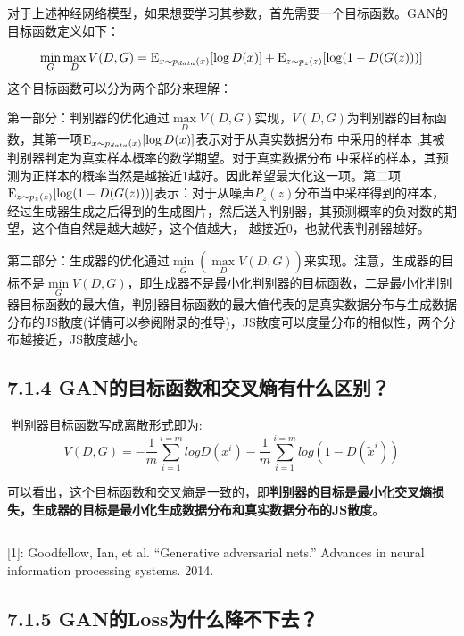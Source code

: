 ​
对于上述神经网络模型，如果想要学习其参数，首先需要一个目标函数。GAN的目标函数定义如下：

\[
\mathop {\min }\limits_G \mathop {\max }\limits_D V(D,G) = {\rm E}_{x\sim{p_{data}(x)}}[\log D(x)] + {\rm E}_{z\sim{p_z}(z)}[\log (1 - D(G(z)))]
\] ​ 这个目标函数可以分为两个部分来理解：

​
第一部分：判别器的优化通过\(\mathop {\max}\limits_D V(D,G)\)实现，\(V(D,G)\)为判别器的目标函数，其第一项\({\rm E}_{x\sim{p_{data}(x)}}[\log D(x)]\)表示对于从真实数据分布
中采用的样本 ,其被判别器判定为真实样本概率的数学期望。对于真实数据分布
中采样的样本，其预测为正样本的概率当然是越接近1越好。因此希望最大化这一项。第二项\({\rm E}_{z\sim{p_z}(z)}[\log (1 - D(G(z)))]\)表示：对于从噪声\(P_z(z)​\)分布当中采样得到的样本，经过生成器生成之后得到的生成图片，然后送入判别器，其预测概率的负对数的期望，这个值自然是越大越好，这个值越大，
越接近0，也就代表判别器越好。

​
第二部分：生成器的优化通过\(\mathop {\min }\limits_G({\mathop {\max }\limits_D V(D,G)})\)来实现。注意，生成器的目标不是\(\mathop {\min }\limits_GV(D,G)\)，即生成器不是最小化判别器的目标函数，二是最小化判别器目标函数的最大值，判别器目标函数的最大值代表的是真实数据分布与生成数据分布的JS散度(详情可以参阅附录的推导)，JS散度可以度量分布的相似性，两个分布越接近，JS散度越小。

\subsection{7.1.4
GAN的目标函数和交叉熵有什么区别？}\label{ganux7684ux76eeux6807ux51fdux6570ux548cux4ea4ux53c9ux71b5ux6709ux4ec0ux4e48ux533aux522b}

​ 判别器目标函数写成离散形式即为: \[
V(D,G)=-\frac{1}{m}\sum_{i=1}^{i=m}logD(x^i)-\frac{1}{m}\sum_{i=1}^{i=m}log(1-D(\tilde{x}^i))
\]

​
可以看出，这个目标函数和交叉熵是一致的，即\textbf{判别器的目标是最小化交叉熵损失，生成器的目标是最小化生成数据分布和真实数据分布的JS散度}。

\begin{center}\rule{0.5\linewidth}{\linethickness}\end{center}

{[}1{]}: Goodfellow, Ian, et al. ``Generative adversarial nets.''
Advances in neural information processing systems. 2014.

\subsection{7.1.5
GAN的Loss为什么降不下去？}\label{ganux7684lossux4e3aux4ec0ux4e48ux964dux4e0dux4e0bux53bb}

